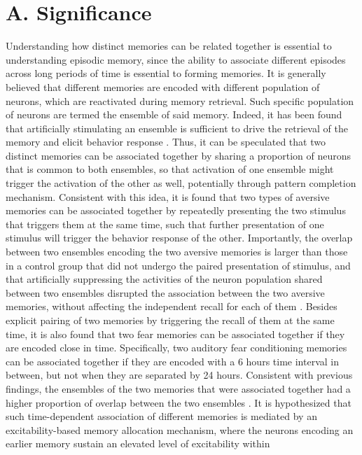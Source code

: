 \documentclass[master.tex]{subfiles}
\begin{document}
\section*{A. Significance}

Understanding how distinct memories can be related together is essential to
understanding episodic memory, since the ability to associate different episodes
across long periods of time is essential to forming memories. It is generally
believed that different memories are encoded with different population of
neurons, which are reactivated during memory retrieval. Such specific population
of neurons are termed the ensemble of said memory. Indeed, it has been found
that artificially stimulating an ensemble is sufficient to drive the retrieval
of the memory and elicit behavior response \cite{ramirez_creating_2013}. Thus,
it can be speculated that two distinct memories can be associated together by
sharing a proportion of neurons that is common to both ensembles, so that
activation of one ensemble might trigger the activation of the other as well,
potentially through pattern completion mechanism. Consistent with this idea, it
is found that two types of aversive memories can be associated together by
repeatedly presenting the two stimulus that triggers them at the same time, such
that further presentation of one stimulus will trigger the behavior response of
the other. Importantly, the overlap between two ensembles encoding the two
aversive memories is larger than those in a control group that did not undergo
the paired presentation of stimulus, and that artificially suppressing the
activities of the neuron population shared between two ensembles disrupted the
association between the two aversive memories, without affecting the independent
recall for each of them \cite{yokose_overlapping_2017}. Besides explicit pairing
of two memories by triggering the recall of them at the same time, it is also
found that two fear memories can be associated together if they are encoded
close in time. Specifically, two auditory fear conditioning memories can be
associated together if they are encoded with a 6 hours time interval in between,
but not when they are separated by 24 hours. Consistent with previous findings,
the ensembles of the two memories that were associated together had a higher
proportion of overlap between the two ensembles \cite{rashid_competition_2016}.
It is hypothesized that such time-dependent association of different memories is
mediated by an excitability-based memory allocation mechanism, where the neurons
encoding an earlier memory sustain an elevated level of excitability within
\end{document}
